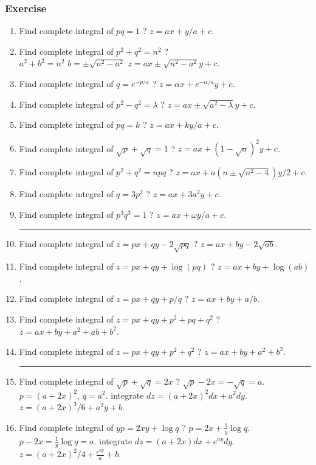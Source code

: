 \subsubsection*{Exercise}
\begin{enumerate}
	\item Find complete integral of $pq = 1$ ?
	$z = ax + y/a + c$.
	\item Find complete integral of $p^2 + q^2 = n^2$ ?\\
	$a^2 + b^2 = n^2$  $b = \pm \sqrt{n^2-a^2}$
	$z = ax \pm \sqrt{n^2-a^2}y + c$.
	\item Find complete integral of $q = e^{-p/a}$ ?
	$z = \alpha x + e^{-\alpha/a} y + c$.
	\item Find complete integral of $p^2 - q^2 = \lambda$ ?
	$z = ax \pm \sqrt{a^2-\lambda}y + c$.
	\item Find complete integral of $pq = k$ ?
	$z = ax + ky/a + c$.
	\item Find complete integral of $\sqrt{p} + \sqrt{q} = 1$ ?
	$z = ax + (1-\sqrt{a})^2y + c$.
	\item Find complete integral of $p^2 + q^2 = npq$ ?
	$z = ax + a(n \pm \sqrt{n^2-4})y/2 + c$.
	\item Find complete integral of $q = 3p^2$ ?
	$z = ax + 3a^2y + c$.
	\item Find complete integral of $p^3q^3 = 1$ ?
	$z = ax + \omega y/a + c$.\\
	\hrule
	\item Find complete integral of $z = px + qy -2\sqrt{pq}$ ? $z = ax + by - 2\sqrt{ab}$.
	\item Find complete integral of $z = px + qy + \log(pq)$ ? $z = ax + by + \log(ab)$.
	\item Find complete integral of $z = px + qy + p/q$ ? $z = ax + by + a/b$.
	\item Find complete integral of $z = px + qy + p^2 + pq + q^2$ ? $z = ax + by + a^2 + ab + b^2$.
	\item Find complete integral of $z = px + qy + p^2 + q^2$ ? $z = ax + by + a^2 + b^2$.\\
	\hrule
	\item Find complete integral of $\sqrt{p} + \sqrt{q} = 2x$ ?
	$\sqrt{p}-2x = -\sqrt{q} = a$.
	$p = (a+2x)^2$, $q = a^2$.
	integrate $dz = (a+2x)^2 dx + a^2 dy$.
	$z = (a+2x)^3/6 + a^2y + b$.
	\item Find complete integral of $yp = 2xy+\log q$ ?
	$p = 2x +\frac{1}{y}\log q$. $p-2x = \frac{1}{y}\log q = a$.
	integrate $dz = (a+2x)dx + e^{ay}dy$.
	$z = (a+2x)^2/4 + \frac{e^{ay}}{a} + b$.

\end{enumerate}
